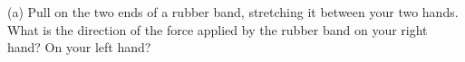 







(a) Pull on the two ends of a rubber band, stretching it between your two hands. 
What is the direction of the force applied
by the rubber band on your right hand? On your left hand?
\answerspace{20mm}

